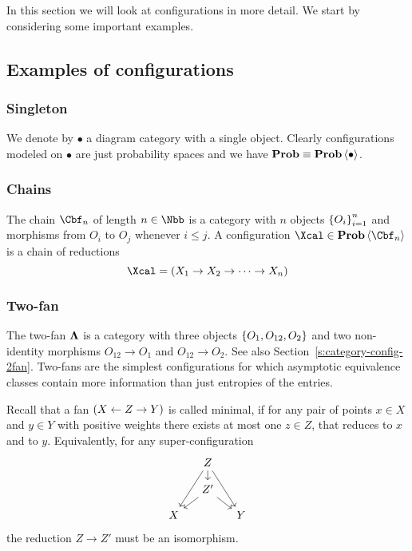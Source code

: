  In this section we will look at configurations in more detail. We
  start by considering some important examples.

\subsection[Examples]{Examples of configurations}\label{s:config-examples}

\subsubsection{Singleton}\label{s:config-examples-single}
  We denote by $\bullet$ a diagram category with a single object.
  Clearly configurations modeled on $\bullet$ are just probability
  spaces and we have $\prob\equiv\prob\<\bullet>$.

\subsubsection{Chains}\label{s:config-examples-chain}
  The chain $\Cbf_{n}$ of length $n\in\Nbb$ is a category with $n$ objects
  $\left\{O_{i}\right\}_{i=1}^{n}$ and morphisms from $O_{i}$ to $O_{j}$
  whenever $i\leq j$. A configuration $\Xcal\in\prob\<\Cbf_{n}>$ is a
  chain of reductions
  \[
    \Xcal=(X_{1}\to X_{2}\to\cdots\to X_{n})
  \]

\subsubsection{Two-fan}\label{s:config-examples-fan}
  The two-fan $\bm\Lambda$ is a category with three objects
  $\left\{O_{1},O_{12},O_{2}\right\}$ and two non-identity morphisms $O_{12}\to
  O_{1}$ and $O_{12}\to O_{2}$.  See also
  Section~\ref{s:category-config-2fan}.  Two-fans are the simplest
  configurations for which asymptotic equivalence classes contain more
  information than just entropies of the entries.
  
  Recall that a fan $(X\stackrel{}{\leftarrow} Z\stackrel{}{\rightarrow} Y)$ is called minimal, if for any pair
  of points $x\in X$ and $y\in Y$ with positive weights there exists at
  most one $z\in Z$, that reduces to $x$ and to $y$. Equivalently, for
  any super-configuration
  \[
  \begin{tikzcd}[column sep=small,row sep=small]
    \mbox{}
    &
    Z
    \arrow{ddl}{}
    \arrow{ddr}{}
    \arrow{d}{}
    &
    \mbox{}
    \\
    \mbox{}
    &
    Z'
    \arrow{dl}{}
    \arrow{dr}{}
    &
    \mbox{}
    \\
    X
    &
    &
    Y
  \end{tikzcd}
  \]
  the reduction $Z\to Z'$ must be an isomorphism.

